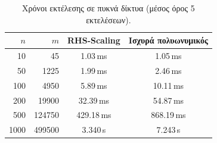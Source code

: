 \begin{table}[h]
\centering
\caption{Χρόνοι εκτέλεσης σε πυκνά δίκτυα (μέσος όρος 5 εκτελέσεων).}
\label{tab:dense}
\begin{tabular}{rrcc}
\toprule
$n$ & $m$ & \textenglish{RHS-Scaling} & Ισχυρά πολυωνυμικός \\
\midrule
  10 & 45 & 1.03\,ms & 1.05\,ms \\
  50 & 1225 & 1.99\,ms & 2.46\,ms \\
  100 & 4950 & 5.89\,ms & 10.11\,ms \\
  200 & 19900 & 32.39\,ms & 54.87\,ms \\
  500 & 124750 & 429.18\,ms & 868.19\,ms \\
  1000 & 499500 & 3.340\,s & 7.243\,s \\
\bottomrule
\end{tabular}
\end{table}

